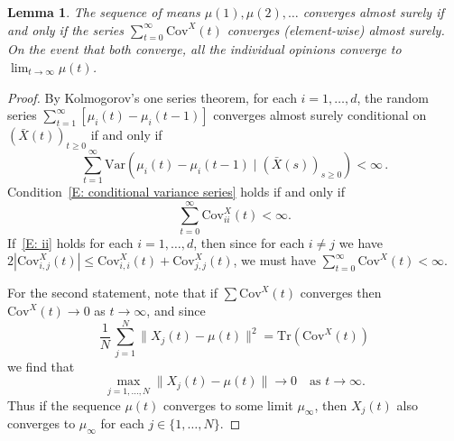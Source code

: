 \documentclass[12pt]{article}
\newtheorem{lemma}{Lemma}
\newcommand{\Cov}{\mathrm{Cov}}
\newcommand{\1}{\mathbf{1}}
\begin{document}
\begin{lemma}\label{lem: condition for mean opinion to converge} 
The sequence of means $\mu(1), \mu(2), \dots $ converges almost surely if and only if the series $\sum_{t=0}^\infty \Cov^X(t)$ converges (element-wise) almost surely. On the event that both converge, all the individual opinions converge to $\lim_{t \to \infty} \mu(t)$.
\end{lemma}
\begin{proof}
By Kolmogorov's one series theorem, for each $i = 1, \dots, d$, the random series $\sum_{t=1}^\infty [\mu_i(t) - \mu_i(t-1)]$  converges almost surely conditional on $\left(\bar{X}(t)\right)_{t \ge 0}$ if and only if 
\begin{equation}\label{E: conditional variance series} 
\sum_{t=1}^\infty \mathrm{Var}\left(\mu_i(t) - \mu_i(t-1) \mid \left(\bar{X}(s)\right)_{s \ge 0} \right) < \infty\,.
\end{equation} 
Condition~\eqref{E: conditional variance series} holds if and only if
\begin{equation}\label{E: ii} \sum_{t=0}^\infty 
\Cov^X_{ii}(t) < \infty.
\end{equation}
If~\eqref{E: ii} holds for each $i=1, \dots, d$, then since for each $i \neq j$ we have  $2\left|\Cov^X_{i,j}(t)\right| \le \Cov^X_{i,i}(t) + \Cov^X_{j,j}(t)$, we must have $\sum_{t=0}^\infty \Cov^X(t) < \infty$.

For the second statement, note that if $\sum \Cov^X(t)$ converges then $\Cov^X(t) \to 0$ as $t \to \infty$, and since 
$$
\frac1N\, \sum_{j=1}^N \| X_j(t) - \mu(t)\|^2 = \mathrm{Tr} (\Cov^X(t))$$
we find that 
$$
\max_{j=1,\dots,N} \|X_j(t) - \mu(t) \| \to 0\quad \text{
as $t \to \infty$.}
$$ 
Thus if the sequence $\mu(t)$  converges to some limit $\mu_\infty$, then $X_j(t)$ also converges to $\mu_\infty$ for each $j\in\{1,\dots,N\}$. 
\end{proof}
\end{document}
